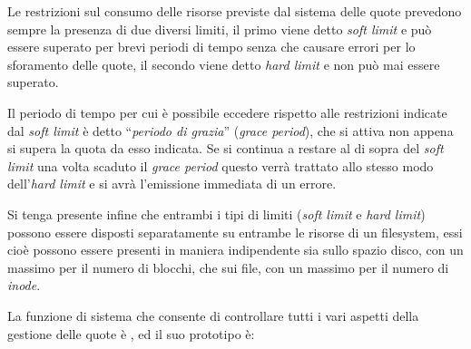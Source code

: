 Le restrizioni sul consumo delle risorse previste dal sistema delle quote
prevedono sempre la presenza di due diversi limiti, il primo viene detto
\textit{soft limit} e può essere superato per brevi periodi di tempo senza che
causare errori per lo sforamento delle quote, il secondo viene detto
\textit{hard limit} e non può mai essere superato.

Il periodo di tempo per cui è possibile eccedere rispetto alle restrizioni
indicate dal \textit{soft limit} è detto ``\textsl{periodo di grazia}''
(\textit{grace period}), che si attiva non appena si supera la quota da esso
indicata. Se si continua a restare al di sopra del \textit{soft limit} una
volta scaduto il \textit{grace period} questo verrà trattato allo stesso modo
dell'\textit{hard limit} e si avrà l'emissione immediata di un errore.

Si tenga presente infine che entrambi i tipi di limiti (\textit{soft limit} e
\textit{hard limit}) possono essere disposti separatamente su entrambe le
risorse di un filesystem, essi cioè possono essere presenti in maniera
indipendente sia sullo spazio disco, con un massimo per il numero di blocchi,
che sui file, con un massimo per il numero di \textit{inode}.

La funzione di sistema che consente di controllare tutti i vari aspetti della
gestione delle quote è , ed il suo prototipo è:

